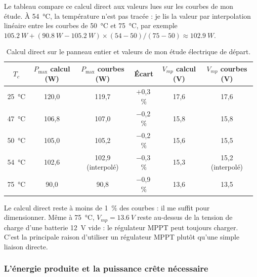 Le tableau compare ce calcul direct aux valeurs lues sur les courbes de mon étude. À \qty{54}{\celsius}, la température n'est pas tracée : je lis la valeur par interpolation linéaire entre les courbes de \qty{50}{\celsius} et \qty{75}{\celsius}, par exemple $\qty{105,2}{W} + (\qty{90,8}{W} - \qty{105,2}{W}) \times (54 - 50)/(75 - 50) \approx \qty{102,9}{W}$.

\begin{table}[H]
\centering
\small
\begin{tabular}{|c|c|c|c|c|c|}
\hline
\textbf{$T_c$} & \textbf{$P_{\max}$ calcul (W)} & \textbf{$P_{\max}$ courbes (W)} & \textbf{Écart} & \textbf{$V_{mp}$ calcul (V)} & \textbf{$V_{mp}$ courbes (V)} \\
\hline
\qty{25}{\celsius} & 120,0 & 119,7 & $+$0,3\,\% & 17,6 & 17,6 \\
\hline
\qty{47}{\celsius} & 106,8 & 107,0 & $-$0,2\,\% & 15,8 & 15,8 \\
\hline
\qty{50}{\celsius} & 105,0 & 105,2 & $-$0,2\,\% & 15,6 & 15,5 \\
\hline
\qty{54}{\celsius} & 102,6 & 102,9 (interpolé) & $-$0,3\,\% & 15,3 & 15,2 (interpolé) \\
\hline
\qty{75}{\celsius} & 90,0 & 90,8 & $-$0,9\,\% & 13,6 & 13,5 \\
\hline
\end{tabular}
\caption{Calcul direct sur le panneau entier et valeurs de mon étude électrique de départ.}
\end{table}

Le calcul direct reste à moins de \qty{1}{\percent} des courbes : il me suffit pour dimensionner. Même à \qty{75}{\celsius}, $V_{mp} = \qty{13,6}{V}$ reste au-dessus de la tension de charge d'une batterie \qty{12}{V} vide : le régulateur MPPT peut toujours charger. C'est la principale raison d'utiliser un régulateur MPPT plutôt qu'une simple liaison directe.

\subsubsection*{L'énergie produite et la puissance crête nécessaire}

